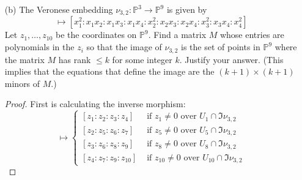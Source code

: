 \documentclass{article}
\begin{document}
\begin{itemize}
\begin{proof}
                ($\varphi^{-1}(\varphi) = id_{\mathbb{P}^{3}}$) We have
                    \begin{align*}
                        \varphi^{-1}(\varphi ([s : t])) &= \varphi^{-1}([s^{3} : s^{2}t : st^{2}: t^{3}]) \\
                                                        &= [s : t]                                          
                    \end{align*}

                Which finishes the proof.
            \end{proof}

        \item [(b)] The Veronese embedding $\nu_{3, 2} : \mathbb{P}^{3} \rightarrow \mathbb{P}^{9}$ is given by
            \begin{equation*}
                [x_{1} : x_{2} : x_{3} : x_{4}] \mapsto [x_{1}^{2} : x_{1}x_{2} : x_{1}x_{3} : x_{1}x_{4} : x_{2}^{2} : x_{2}x_{3} : x_{2}x_{4} : x_{3}^{2}: x_{3}x_{4} : x_{4}^{2}]
            \end{equation*}
        Let $z_{1}, \ldots, z_{10}$ be the coordinates on $\mathbb{P}^{9}$. Find a matrix $M$ whose entries are polynomials in the $z_{i}$ so that the image of $\nu_{3, 2}$ is the set of points in $\mathbb{P}^{9}$ where the matrix $M$ has rank $\leq k$ for some integer $k$. Justify your answer. (This implies that the equations that define the image are the $(k + 1) \times (k + 1)$ minors of $M$.)
            \begin{proof}
                First is calculating the inverse morphism:
                    \begin{equation*}
                        [z_{1} : z_{2} : \cdots : z_{9} : z_{10}] \mapsto \begin{cases}
                            [z_{1} : z_{2} : z_{3} : z_{4}] &\text{ if } z_{1} \neq 0 \text{ over } U_{1} \cap \Im{\nu_{3, 2}} \\
                            [z_{2} : z_{5} : z_{6} : z_{7}] &\text{ if } z_{5} \neq 0 \text{ over } U_{5} \cap \Im{\nu_{3, 2}} \\
                            [z_{3} : z_{6} : z_{8} : z_{9}] &\text{ if } z_{8} \neq 0 \text{ over } U_{8} \cap \Im{\nu_{3, 2}} \\
                            [z_{4} : z_{7} : z_{9} : z_{10}] &\text{ if } z_{10} \neq 0 \text{ over } U_{10} \cap \Im{\nu_{3, 2}}   
                        \end{cases}
                    \end{equation*}

\end{proof}
\end{itemize}
\end{document}
